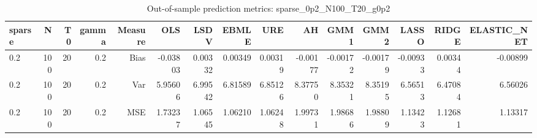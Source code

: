 \begin{table}[!htbp]\centering
\caption{Out-of-sample prediction metrics: sparse_0p2_N100_T20_g0p2}
\label{tab:table3_sparse_0p2_N100_T20_g0p2}
\begin{tabular}{lrrrrrrrrrrrrrr}
\hline
sparse & N & T0 & gamma & Measure & OLS & LSDV & EBMLE & URE & AH & GMM1 & GMM2 & LASSO & RIDGE & ELASTIC_NET \\
\hline
0.2 & 100 & 20 & 0.2 & Bias & -0.03803 & 0.00332 & 0.00349 & 0.00319 & -0.00177 & -0.00172 & -0.00179 & -0.00933 & 0.00344 & -0.00899 \\
0.2 & 100 & 20 & 0.2 & Var & 5.95606 & 6.99542 & 6.81589 & 6.85126 & 8.37750 & 8.35321 & 8.35195 & 6.56513 & 6.47084 & 6.56026 \\
0.2 & 100 & 20 & 0.2 & MSE & 1.73237 & 1.06545 & 1.06210 & 1.06248 & 1.99731 & 1.98686 & 1.98809 & 1.13423 & 1.12681 & 1.13317 \\
\hline
\end{tabular}
\end{table}


